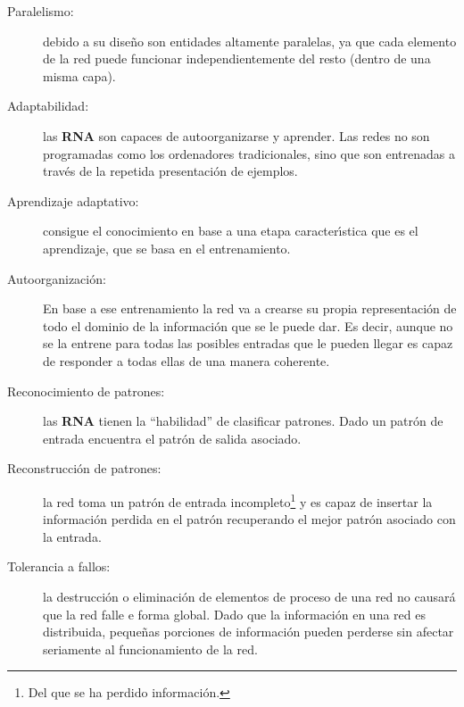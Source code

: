 \begin{description}
\item[Paralelismo:] debido a su dise\~no son entidades altamente paralelas, ya
que cada elemento de la red puede funcionar independientemente del resto (dentro
de una misma capa).
\item[Adaptabilidad:] las \textbf{RNA} son capaces de autoorganizarse y
aprender. Las redes no son programadas como los ordenadores tradicionales, sino
que son entrenadas a trav\'es de la repetida presentaci\'on de ejemplos.
\item[Aprendizaje adaptativo:] consigue el conocimiento en base a una etapa
caracter\'{\i}stica que es el aprendizaje, que se basa en el entrenamiento.
\item[Autoorganizaci\'on:] En base a ese entrenamiento la red va a crearse su
propia representaci\'on de todo el dominio de la informaci\'on que se le puede
dar. Es decir, aunque no se la entrene para todas las posibles entradas que le
pueden llegar es capaz de responder a todas ellas de una manera coherente.
\item[Reconocimiento de patrones:] las \textbf{RNA} tienen la ``habilidad'' de
clasificar patrones. Dado un patr\'on de entrada encuentra el patr\'on de
salida asociado.
\item[Reconstrucci\'on de patrones:] la red toma un patr\'on de entrada
incompleto\footnote{Del que se ha perdido informaci\'on.} y es capaz de
insertar la informaci\'on perdida en el patr\'on recuperando el mejor patr\'on
asociado con la entrada.
\item[Tolerancia a fallos:] la destrucci\'on o eliminaci\'on de elementos de
proceso de una red no causar\'a que la red falle e forma global. Dado que la
informaci\'on en una red es distribuida, peque\~nas porciones de informaci\'on
pueden perderse sin afectar seriamente al funcionamiento de la red.
\end{description}

